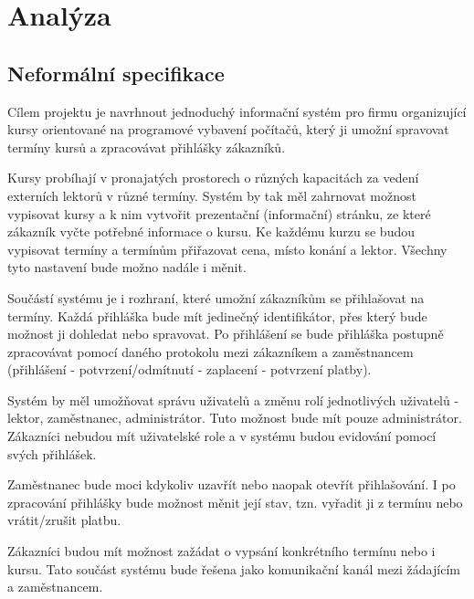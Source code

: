 \documentclass[12pt,a4paper,titlepage,final]{report}
\begin{document}
	\def\authora{Michal Riša}
	\def\authorb{Pavel Macenauer}
	\def\emaila{xrisam01@stud.fit.vutbr.cz}
	\def\emailb{xmacen02@stud.fit.vutbr.cz}
	\def\docname{Firma2}
	\def\projname{Prvotná analýza a plán projektu}
	
	\newpage
	\pagestyle{plain}
	\setcounter{page}{1}
	\setcounter{secnumdepth}{-1}
	


	\chapter{Analýza}
	
	\section{Neformální specifikace}
	Cílem projektu je navrhnout jednoduchý informační systém pro firmu organizující kursy orientované na programové vybavení počítačů, který ji umožní spravovat termíny kursů a zpracovávat přihlášky zákazníků.
	
	Kursy probíhají v pronajatých prostorech o různých kapacitách za vedení externích lektorů v různé termíny. Systém by tak měl zahrnovat možnost vypisovat kursy a k nim vytvořit prezentační (informační) stránku, ze které zákazník vyčte potřebné informace o kursu. Ke každému kurzu se budou vypisovat termíny a termínům přiřazovat cena, místo konání a lektor. Všechny tyto nastavení bude možno nadále i měnit.
	
	Součástí systému je i rozhraní, které umožní zákazníkům se přihlašovat na termíny. Každá přihláška bude mít jedinečný identifikátor, přes který bude možnost ji dohledat nebo spravovat. Po přihlášení se bude přihláška postupně zpracovávat pomocí daného protokolu mezi zákazníkem a zaměstnancem (přihlášení - potvrzení/odmítnutí - zaplacení - potvrzení platby).
	
	Systém by měl umožňovat správu uživatelů a změnu rolí jednotlivých uživatelů - lektor, zaměstnanec, administrátor. Tuto možnost bude mít pouze administrátor. Zákazníci nebudou mít uživatelské role a v systému budou evidování pomocí svých přihlášek.
	
	Zaměstnanec bude moci kdykoliv uzavřít nebo naopak otevřít přihlašování. I po zpracování přihlášky bude možnost měnit její stav, tzn. vyřadit ji z termínu nebo vrátit/zrušit platbu.
	
	Zákazníci budou mít možnost zažádat o vypsání konkrétního termínu nebo i kursu. Tato součást systému bude řešena jako komunikační kanál mezi žádajícím a zaměstnancem.
	
\end{document}
